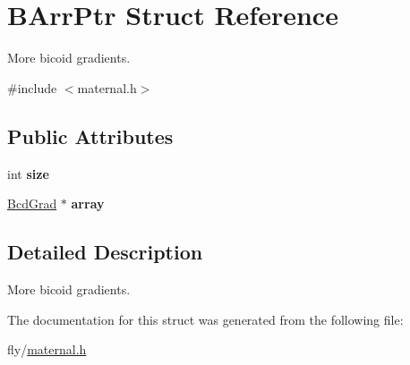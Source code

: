 \hypertarget{structBArrPtr}{
\section{BArrPtr Struct Reference}
\label{structBArrPtr}
}


More bicoid gradients.  


{\ttfamily \#include $<$maternal.h$>$}\subsection*{Public Attributes}
\begin{DoxyCompactItemize}
\item 
\hypertarget{structBArrPtr_aeff2738a28c932524f319f87858c30ab}{
int {\bfseries size}}
\label{structBArrPtr_aeff2738a28c932524f319f87858c30ab}

\item 
\hypertarget{structBArrPtr_a048c0593c9453c49c9ddf60c56ab7b96}{
\hyperlink{structBcdGrad}{BcdGrad} $\ast$ {\bfseries array}}
\label{structBArrPtr_a048c0593c9453c49c9ddf60c56ab7b96}

\end{DoxyCompactItemize}


\subsection{Detailed Description}
More bicoid gradients. 

The documentation for this struct was generated from the following file:\begin{DoxyCompactItemize}
\item 
fly/\hyperlink{maternal_8h}{maternal.h}\end{DoxyCompactItemize}
